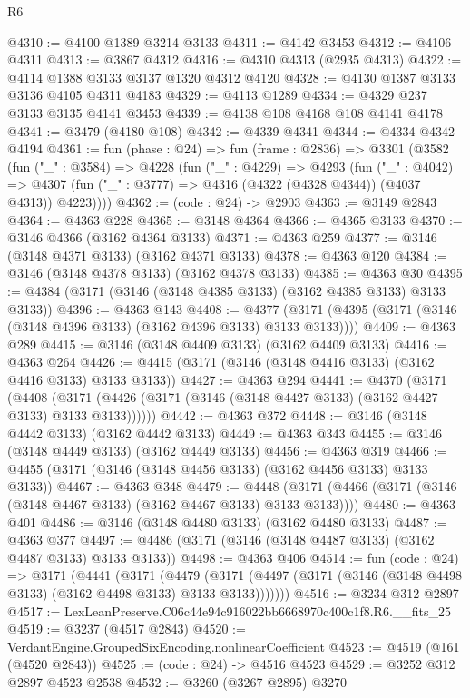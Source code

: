 \begin{lexlean}{R6}
\begin{coremodule}
@4310 := @4100 @1389 @3214 @3133
@4311 := @4142 @3453
@4312 := @4106 @4311
@4313 := @3867 @4312
@4316 := @4310 @4313 (@2935 @4313)
@4322 := @4114 @1388 @3133 @3137 @1320 @4312 @4120
@4328 := @4130 @1387 @3133 @3136 @4105 @4311 @4183
@4329 := @4113 @1289
@4334 := @4329 @237 @3133 @3135 @4141 @3453
@4339 := @4138 @108 @4168 @108 @4141 @4178
@4341 := @3479 (@4180 @108)
@4342 := @4339 @4341
@4344 := @4334 @4342 @4194
@4361 := fun (phase : @24) =>
  fun (frame : @2836) =>
  @3301
    (@3582
      (fun ("_" : @3584) =>
      @4228
        (fun ("_" : @4229) =>
        @4293
          (fun ("_" : @4042) =>
          @4307 (fun ("_" : @3777) => @4316 (@4322 (@4328 @4344)) (@4037 @4313)) @4223))))
@4362 := (code : @24) -> @2903
@4363 := @3149 @2843
@4364 := @4363 @228
@4365 := @3148 @4364
@4366 := @4365 @3133
@4370 := @3146 @4366 (@3162 @4364 @3133)
@4371 := @4363 @259
@4377 := @3146 (@3148 @4371 @3133) (@3162 @4371 @3133)
@4378 := @4363 @120
@4384 := @3146 (@3148 @4378 @3133) (@3162 @4378 @3133)
@4385 := @4363 @30
@4395 := @4384 (@3171 (@3146 (@3148 @4385 @3133) (@3162 @4385 @3133) @3133 @3133))
@4396 := @4363 @143
@4408 := @4377 (@3171 (@4395 (@3171 (@3146 (@3148 @4396 @3133) (@3162 @4396 @3133) @3133 @3133))))
@4409 := @4363 @289
@4415 := @3146 (@3148 @4409 @3133) (@3162 @4409 @3133)
@4416 := @4363 @264
@4426 := @4415 (@3171 (@3146 (@3148 @4416 @3133) (@3162 @4416 @3133) @3133 @3133))
@4427 := @4363 @294
@4441 := @4370
    (@3171
      (@4408 (@3171 (@4426 (@3171 (@3146 (@3148 @4427 @3133) (@3162 @4427 @3133) @3133 @3133))))))
@4442 := @4363 @372
@4448 := @3146 (@3148 @4442 @3133) (@3162 @4442 @3133)
@4449 := @4363 @343
@4455 := @3146 (@3148 @4449 @3133) (@3162 @4449 @3133)
@4456 := @4363 @319
@4466 := @4455 (@3171 (@3146 (@3148 @4456 @3133) (@3162 @4456 @3133) @3133 @3133))
@4467 := @4363 @348
@4479 := @4448 (@3171 (@4466 (@3171 (@3146 (@3148 @4467 @3133) (@3162 @4467 @3133) @3133 @3133))))
@4480 := @4363 @401
@4486 := @3146 (@3148 @4480 @3133) (@3162 @4480 @3133)
@4487 := @4363 @377
@4497 := @4486 (@3171 (@3146 (@3148 @4487 @3133) (@3162 @4487 @3133) @3133 @3133))
@4498 := @4363 @406
@4514 := fun (code : @24) =>
  @3171
    (@4441
      (@3171
        (@4479
          (@3171 (@4497 (@3171 (@3146 (@3148 @4498 @3133) (@3162 @4498 @3133) @3133 @3133)))))))
@4516 := @3234 @312 @2897
@4517 := LexLeanPreserve.C06c44e94c916022bb6668970c400c1f8.R6.__fits_25
@4519 := @3237 (@4517 @2843)
@4520 := VerdantEngine.GroupedSixEncoding.nonlinearCoefficient
@4523 := @4519 (@161 (@4520 @2843))
@4525 := (code : @24) -> @4516 @4523
@4529 := @3252 @312 @2897 @4523 @2538
@4532 := @3260 (@3267 @2895) @3270

\end{coremodule}
\end{lexlean}
